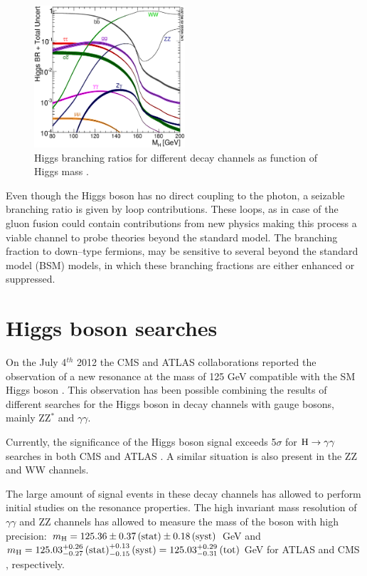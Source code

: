 \begin{figure}
\centering
\includegraphics[width=0.5\textwidth]{1_Introduction_Th_and_Exp/pics/Higgs_BR_LM.eps}
\caption{Higgs branching ratios for different decay channels as function of Higgs mass \cite{Heinemeyer:2013tqa}.}
\label{fig:hbr}
\end{figure}

Even though the Higgs boson has no direct coupling to the photon, a seizable branching ratio is given by loop contributions. These loops, as in case of the gluon fusion could contain contributions from new physics making this process a viable channel to probe theories beyond the standard model. The branching fraction to down--type fermions, may be sensitive to several beyond the standard model (BSM) models, in which these branching fractions are either enhanced or suppressed.

\section{Higgs boson searches}

On the July 4$^{th}$ 2012 the CMS and ATLAS collaborations reported the observation of a new resonance at the mass of 125 GeV compatible with the SM Higgs boson \cite{Chatrchyan:2013lba}. This observation has been possible combining the results of different searches for the Higgs boson in decay channels with gauge bosons, mainly ZZ$^*$ and $\gamma\gamma$.

Currently, the significance of the Higgs boson signal exceeds 5$\sigma$ for $\mathrm{H}\rightarrow\gamma\gamma$ searches in both CMS and ATLAS \cite{Khachatryan:2014ira, ATLASCONF:2014009}. A similar situation is also present in the ZZ and WW channels.

The large amount of signal events in these decay channels has allowed to perform initial studies on the resonance properties. The high invariant mass resolution of $\gamma\gamma$ and ZZ channels has allowed to measure the mass of the boson with high precision: $m_{\mathrm{H}} = 125.36 \pm 0.37\, \mathrm{(stat)} \pm 0.18\, \mathrm{(syst)}$ GeV and $m_{\mathrm{H}} = 125.03^{+0.26}_{-0.27} \,\mathrm{(stat)}^{+0.13}_{-0.15}  \,\mathrm{(syst)} = 125.03^{+0.29}_{-0.31} \, \mathrm{(tot)}$ GeV for ATLAS \cite{Aad:2014aba} and CMS \cite{CMS:2014ega}, respectively.

